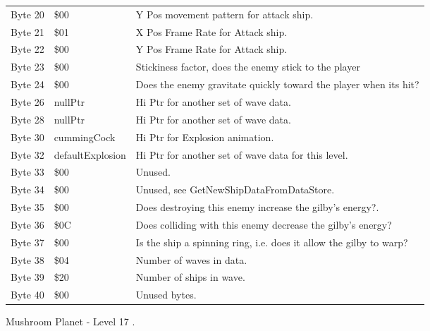 \begin{figure}[H]
{\begin{adjustbox}{width=12cm}
\begin{tabular}{lll}
 Byte 20 & \$00              & Y Pos movement pattern for attack ship.                            \\
 Byte 21 & \$01              & X Pos Frame Rate for Attack ship.                                  \\
 Byte 22 & \$00              & Y Pos Frame Rate for Attack ship.                                  \\
 Byte 23 & \$00              & Stickiness factor, does the enemy stick to the player              \\
 Byte 24 & \$00              & Does the enemy gravitate quickly toward the player when its hit?   \\
 Byte 26 & nullPtr          & Hi Ptr for another set of wave data.                               \\
 Byte 28 & nullPtr          & Hi Ptr for another set of wave data.                               \\
 Byte 30 & cummingCock      & Hi Ptr for Explosion animation.                                    \\
 Byte 32 & defaultExplosion & Hi Ptr for another set of wave data for this level.                \\
 Byte 33 & \$00              & Unused.                                                            \\
 Byte 34 & \$00              & Unused, see GetNewShipDataFromDataStore.                           \\
 Byte 35 & \$00              & Does destroying this enemy increase the gilby's energy?.           \\
 Byte 36 & \$0C              & Does colliding with this enemy decrease the gilby's energy?        \\
 Byte 37 & \$00              & Is the ship a spinning ring, i.e. does it allow the gilby to warp? \\
 Byte 38 & \$04              & Number of waves in data.                                           \\
 Byte 39 & \$20              & Number of ships in wave.                                           \\
 Byte 40 & \$00              & Unused bytes.                                                      \\
\bottomrule
\end{tabular}

  \end{adjustbox}

  }\caption*{Mushroom Planet - Level 17
.}
\end{figure}


